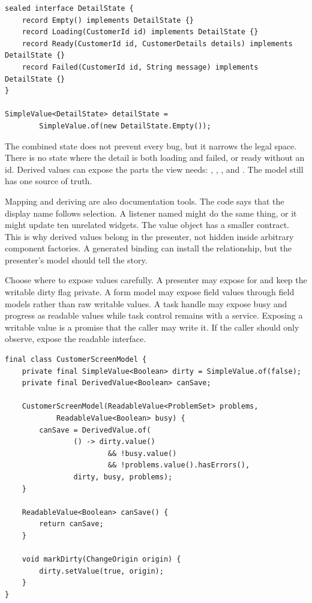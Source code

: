 \begin{lstlisting}[caption={A combined screen mode avoids impossible states.}]
sealed interface DetailState {
    record Empty() implements DetailState {}
    record Loading(CustomerId id) implements DetailState {}
    record Ready(CustomerId id, CustomerDetails details) implements DetailState {}
    record Failed(CustomerId id, String message) implements DetailState {}
}

SimpleValue<DetailState> detailState =
        SimpleValue.of(new DetailState.Empty());
\end{lstlisting}

The combined state does not prevent every bug, but it narrows the legal space.
There is no state where the detail is both loading and failed, or ready without
an id. Derived values can expose the parts the view needs: ,
, , and . The model still
has one source of truth.

Mapping and deriving are also documentation tools. The code
 says that the
display name follows selection. A listener named  might do
the same thing, or it might update ten unrelated widgets. The value object has a
smaller contract. This is why derived values belong in the presenter, not hidden
inside arbitrary component factories. A generated binding can install the
relationship, but the presenter's model should tell the story.

Choose where to expose values carefully. A presenter may expose
 for  and keep the writable dirty flag
private. A form model may expose field values through field models rather than
raw writable values. A task handle may expose busy and progress as readable
values while task control remains with a service. Exposing a writable value is a
promise that the caller may write it. If the caller should only observe, expose
the readable interface.

\begin{lstlisting}[caption={Expose readable facts, keep writable ownership local.}]
final class CustomerScreenModel {
    private final SimpleValue<Boolean> dirty = SimpleValue.of(false);
    private final DerivedValue<Boolean> canSave;

    CustomerScreenModel(ReadableValue<ProblemSet> problems,
            ReadableValue<Boolean> busy) {
        canSave = DerivedValue.of(
                () -> dirty.value()
                        && !busy.value()
                        && !problems.value().hasErrors(),
                dirty, busy, problems);
    }

    ReadableValue<Boolean> canSave() {
        return canSave;
    }

    void markDirty(ChangeOrigin origin) {
        dirty.setValue(true, origin);
    }
}
\end{lstlisting}

